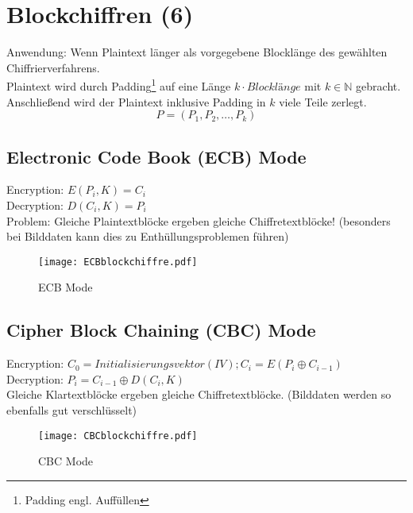 \chapter{Blockchiffren (6)}
Anwendung: Wenn Plaintext länger als vorgegebene Blocklänge des gewählten Chiffrierverfahrens. \\
Plaintext wird durch Padding\footnote{Padding engl. Auffüllen} auf eine Länge $k \cdot Blocklänge$ mit $k \in \mathbb{N}$ gebracht. Anschließend wird der Plaintext inklusive Padding in $k$ viele Teile zerlegt.
$$ P = (P_1, P_2, \ldots, P_k) $$

\section{Electronic Code Book (ECB) Mode}
Encryption: $E(P_i, K) = C_i$ \\
Decryption: $D(C_i, K) = P_i$ \\
Problem: Gleiche Plaintextblöcke ergeben gleiche Chiffretextblöcke! (besonders bei Bilddaten kann dies zu Enthüllungsproblemen führen)
\begin{figure}[htp]
	\centering
	\texttt{[image: ECBblockchiffre.pdf]}
	\caption{ECB Mode}
\end{figure}

\section{Cipher Block Chaining (CBC) Mode}
Encryption: $ C_0 = Initialisierungsvektor (IV); C_i = E(P_i \oplus C_{i-1}) $ \\
Decryption: $ P_i = C_{i-1} \oplus D(C_i, K) $ \\
Gleiche Klartextblöcke ergeben gleiche Chiffretextblöcke. (Bilddaten werden so ebenfalls gut verschlüsselt)
\begin{figure}[htp]
	\centering
	\texttt{[image: CBCblockchiffre.pdf]}
	\caption{CBC Mode}
\end{figure}





